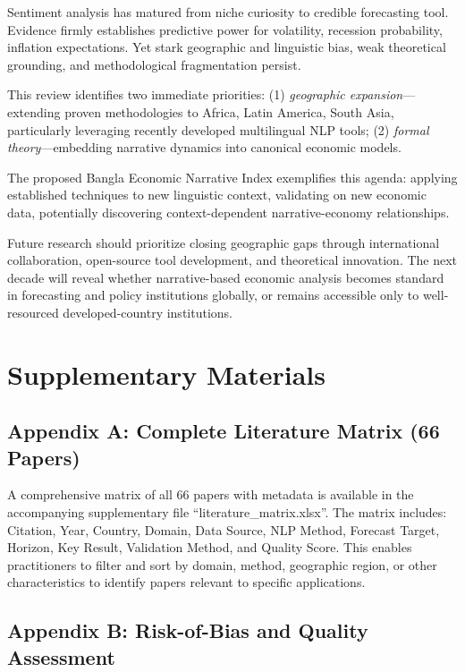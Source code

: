 \documentclass[11pt]{article}
\begin{document}
Sentiment analysis has matured from niche curiosity to credible forecasting tool. Evidence firmly establishes predictive power for volatility, recession probability, inflation expectations. Yet stark geographic and linguistic bias, weak theoretical grounding, and methodological fragmentation persist.

This review identifies two immediate priorities: (1) \textit{geographic expansion}—extending proven methodologies to Africa, Latin America, South Asia, particularly leveraging recently developed multilingual NLP tools; (2) \textit{formal theory}—embedding narrative dynamics into canonical economic models.

The proposed Bangla Economic Narrative Index exemplifies this agenda: applying established techniques to new linguistic context, validating on new economic data, potentially discovering context-dependent narrative-economy relationships.

Future research should prioritize closing geographic gaps through international collaboration, open-source tool development, and theoretical innovation. The next decade will reveal whether narrative-based economic analysis becomes standard in forecasting and policy institutions globally, or remains accessible only to well-resourced developed-country institutions.

\appendix

\section{Supplementary Materials}

\subsection*{Appendix A: Complete Literature Matrix (66 Papers)}

A comprehensive matrix of all 66 papers with metadata is available in the accompanying supplementary file ``literature\_matrix.xlsx''. The matrix includes: Citation, Year, Country, Domain, Data Source, NLP Method, Forecast Target, Horizon, Key Result, Validation Method, and Quality Score. This enables practitioners to filter and sort by domain, method, geographic region, or other characteristics to identify papers relevant to specific applications.

\subsection*{Appendix B: Risk-of-Bias and Quality Assessment}
\end{document}
